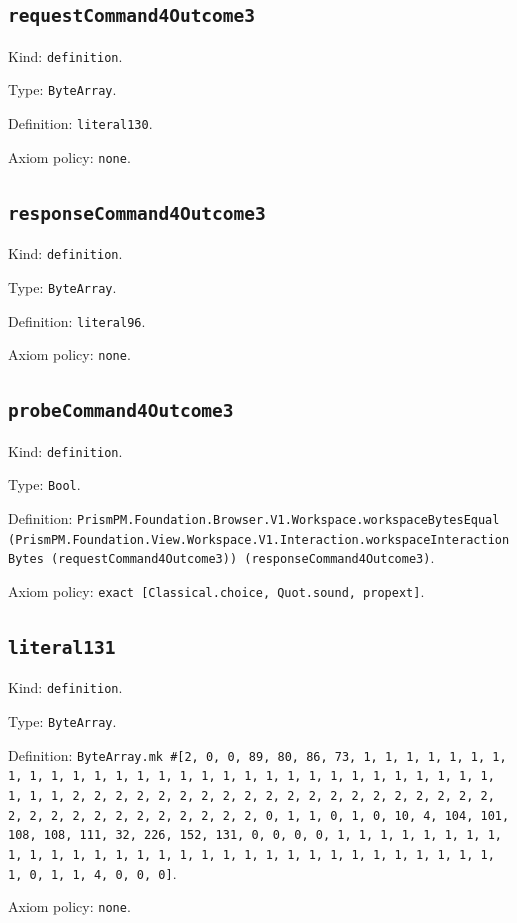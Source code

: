 \documentclass[11pt]{article}
\begin{document}
\subsection*{\texttt{requestCommand4Outcome3}}
\noindent Kind: \texttt{definition}.\par
\noindent Type: \texttt{ByteArray}.\par
\noindent Definition: \texttt{literal130}.\par
\noindent Axiom policy: \texttt{none}.\par
\subsection*{\texttt{responseCommand4Outcome3}}
\noindent Kind: \texttt{definition}.\par
\noindent Type: \texttt{ByteArray}.\par
\noindent Definition: \texttt{literal96}.\par
\noindent Axiom policy: \texttt{none}.\par
\subsection*{\texttt{probeCommand4Outcome3}}
\noindent Kind: \texttt{definition}.\par
\noindent Type: \texttt{Bool}.\par
\noindent Definition: \texttt{PrismPM.Foundation.Browser.V1.Workspace.workspaceBytesEqual (PrismPM.Foundation.View.Workspace.V1.Interaction.workspaceInteractionBytes (requestCommand4Outcome3)) (responseCommand4Outcome3)}.\par
\noindent Axiom policy: \texttt{exact [Classical.choice, Quot.sound, propext]}.\par
\subsection*{\texttt{literal131}}
\noindent Kind: \texttt{definition}.\par
\noindent Type: \texttt{ByteArray}.\par
\noindent Definition: \texttt{ByteArray.mk \#[2, 0, 0, 89, 80, 86, 73, 1, 1, 1, 1, 1, 1, 1, 1, 1, 1, 1, 1, 1, 1, 1, 1, 1, 1, 1, 1, 1, 1, 1, 1, 1, 1, 1, 1, 1, 1, 1, 1, 1, 2, 2, 2, 2, 2, 2, 2, 2, 2, 2, 2, 2, 2, 2, 2, 2, 2, 2, 2, 2, 2, 2, 2, 2, 2, 2, 2, 2, 2, 2, 2, 2, 0, 1, 1, 0, 1, 0, 10, 4, 104, 101, 108, 108, 111, 32, 226, 152, 131, 0, 0, 0, 0, 1, 1, 1, 1, 1, 1, 1, 1, 1, 1, 1, 1, 1, 1, 1, 1, 1, 1, 1, 1, 1, 1, 1, 1, 1, 1, 1, 1, 1, 1, 1, 1, 0, 1, 1, 4, 0, 0, 0]}.\par
\noindent Axiom policy: \texttt{none}.\par
\end{document}
